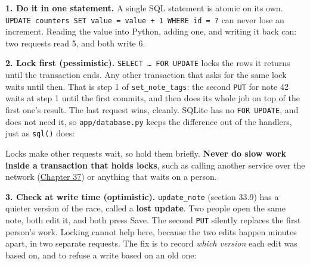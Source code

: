 \textbf{1. Do it in one statement.} A single SQL statement is atomic on its own. \texttt{UPDATE\ counters\ SET\ value\ =}\allowbreak{}\texttt{\ value\ +\ 1\ WHERE\ id\ =}\allowbreak{}\texttt{\ ?} can never lose an increment. Reading the value into Python, adding one, and writing it back can: two requests read 5, and both write 6.

\textbf{2. Lock first (pessimistic).} \texttt{SELECT\ …\ FOR\ UPDATE} locks the rows it returns until the transaction ends. Any other transaction that asks for the same lock waits until then. That is step 1 of \texttt{set\_note\_tags}: the second \texttt{PUT} for note 42 waits at step 1 until the first commits, and then does its whole job on top of the first one's result. The last request wins, cleanly. SQLite has no \texttt{FOR\ UPDATE}, and does not need it, so \texttt{app/database.py} keeps the difference out of the handlers, just as \texttt{sql()} does:

\begin{codebox}[short]

\begin{Shaded}
\begin{Highlighting}[]
\NormalTok{) }\OperatorTok{{-}\textgreater{}} \NormalTok{:}
    \OperatorTok{+} 
\end{Highlighting}
\end{Shaded}

\end{codebox}

\noindent{}Locks make other requests wait, so hold them briefly. \textbf{Never do slow work inside a transaction that holds locks}, such as calling another service over the network (\hyperref[ch:37-reliability]{Chapter 37}) or anything that waits on a person.

\textbf{3. Check at write time (optimistic).} \texttt{update\_note} (section 33.9) has a quieter version of the race, called a \textbf{lost update}. Two people open the same note, both edit it, and both press Save. The second \texttt{PUT} silently replaces the first person's work. Locking cannot help here, because the two edits happen minutes apart, in two separate requests. The fix is to record \emph{which version} each edit was based on, and to refuse a write based on an old one:

